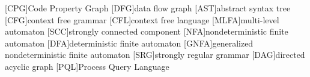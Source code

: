  
[CPG]{Code Property Graph}
[DFG]{data flow graph}
[AST]{abstract syntax tree}
[CFG]{context free grammar}
[CFL]{context free language}
[MLFA]{multi-level automaton}
[SCC]{strongly connected component}
[NFA]{nondeterministic finite automaton}
[DFA]{deterministic finite automaton}
[GNFA]{generalized nondeterministic finite automaton}
[SRG]{strongly regular grammar}
[DAG]{directed acyclic graph}
[PQL]{Process Query Language}
